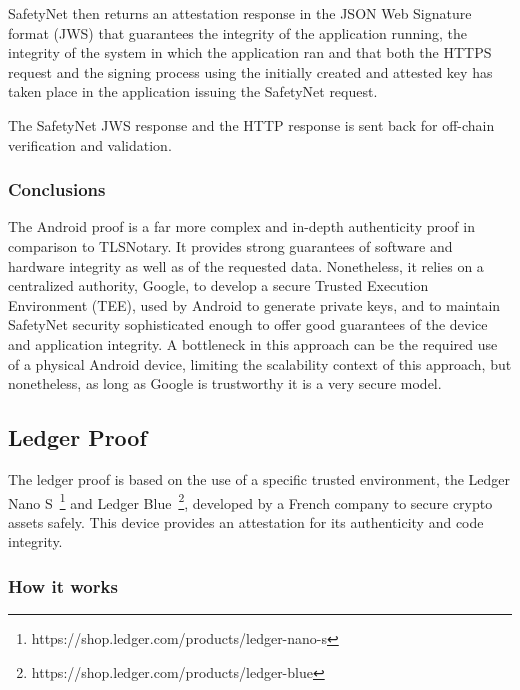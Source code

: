SafetyNet then returns an attestation response in the JSON Web Signature format (JWS) that guarantees the integrity of the application running, the integrity of the system in which the application ran and that both the HTTPS request and the signing process using the initially created and attested key has taken place in the application issuing the SafetyNet request.

The SafetyNet JWS response and the HTTP response is sent back for off-chain verification and validation.

\subsubsection{Conclusions}
The Android proof is a far more complex and in-depth authenticity proof in comparison to TLSNotary. It provides strong guarantees of software and hardware integrity as well as of the requested data. Nonetheless, it relies on a centralized authority, Google, to develop a secure Trusted Execution Environment (TEE), used by Android to generate private keys, and to maintain SafetyNet security sophisticated enough to offer good guarantees of the device and application integrity. A bottleneck in this approach can be the required use of a physical Android device, limiting the scalability context of this approach, but nonetheless, as long as Google is trustworthy it is a very secure model.

\subsection{Ledger Proof}

The ledger proof is based on the use of a specific trusted environment, the Ledger Nano S~\footnote{https://shop.ledger.com/products/ledger-nano-s} and Ledger Blue~\footnote{https://shop.ledger.com/products/ledger-blue}, developed by a French company to secure crypto assets safely. This device provides an attestation for its authenticity and code integrity.

\subsubsection{How it works}

